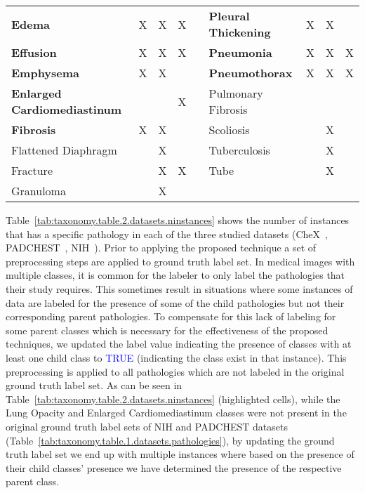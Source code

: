 \begin{table}[htbp]
{\begin{tabular}{lcccrlccc}
\cellcolor[HTML]{E9ECE6}\textbf{Edema} & \cellcolor[HTML]{E9ECE6}X & \cellcolor[HTML]{E9ECE6}X & \cellcolor[HTML]{E9ECE6}X &  & \textbf{Pleural Thickening} & X & X &  \\
\textbf{Effusion} & X & X & X &  & \cellcolor[HTML]{E9ECE6}\textbf{Pneumonia} & \cellcolor[HTML]{E9ECE6}X & \cellcolor[HTML]{E9ECE6}X & \cellcolor[HTML]{E9ECE6}X \\
\textbf{Emphysema} & X & X &  &  & \textbf{Pneumothorax} & X & X & X \\
\cellcolor[HTML]{E9ECE6}\textbf{Enlarged   Cardiomediastinum} & \cellcolor[HTML]{E9ECE6} & \cellcolor[HTML]{E9ECE6} & \cellcolor[HTML]{E9ECE6}X & \multicolumn{1}{l}{} & {Pulmonary Fibrosis} &  &  &  \\
\textbf{Fibrosis} & X & X &  &  & {Scoliosis} &  & X &  \\
{Flattened   Diaphragm} &  & X &  &  & {Tuberculosis} &  & X &  \\
{Fracture} &  & X & X &  & {Tube} &  & X &  \\
{Granuloma} &  & X &  &  &  & \multicolumn{1}{l}{} & \multicolumn{1}{l}{} & \multicolumn{1}{l}{}
\end{tabular}}
\end{table}
Table~\ref{tab:taxonomy.table.2.datasets.ninstances} shows the number of instances that has a specific pathology in each of the three studied datasets (CheX~\cite{irvin_CheXpert_2019}, PADCHEST~\cite{bustos_Padchest_2020}, NIH~\cite{wang_ChestXRay8_2017}). Prior to applying the proposed technique a set of preprocessing steps are applied to ground truth label set. In medical images with multiple classes, it is common for the labeler to only label the pathologies that their study requires. This sometimes result in situations where some instances of data are labeled for the presence of some of the child pathologies but not their corresponding parent pathologies. To compensate for this lack of labeling for some parent classes which is necessary for the effectiveness of the proposed techniques, we updated the label value indicating the presence of classes with at least one child class to \textcolor{blue}{TRUE} (indicating the class exist in that instance). This preprocessing is applied to all pathologies which are not labeled in the original ground truth label set. As can be seen in Table~\ref{tab:taxonomy.table.2.datasets.ninstances} (\colorbox{mygreen}{highlighted cells}), while the Lung Opacity and Enlarged Cardiomediastinum classes were not present in the original ground truth label sets of NIH and PADCHEST datasets (Table~\ref{tab:taxonomy.table.1.datasets.pathologies}), by updating the ground truth label set we end up with multiple instances where based on the presence of their child classes' presence we have determined the presence of the respective parent class.
